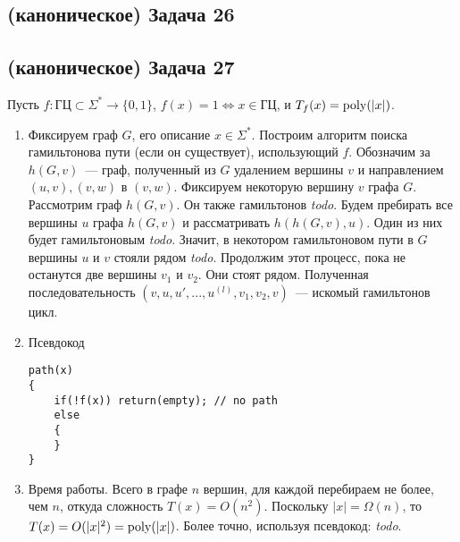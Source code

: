 \documentclass[a4paper]{article}
\def\poly{{\rm{poly}}}
\def\GC{{\mbox{ГЦ}}}
\newcommand{\todo}{{\em todo}}
\begin{document}
\subsection*{(каноническое) Задача 26}
\subsection*{(каноническое) Задача 27}
Пусть $f\colon \GC\subset\Sigma^*\to\{0,1\}$, $f(x)=1\Leftrightarrow x\in\GC$, и $T_f(x)=\poly(|x|)$.
\begin{enumerate}
\item Фиксируем граф $G$, его описание $x\in\Sigma^*$. Построим алгоритм поиска гамильтонова пути (если он существует), использующий $f$. Обозначим за $h(G, v)$~--- граф, полученный из $G$ удалением вершины $v$ и направлением $(u,v), (v, w)$ в $(v, w)$. Фиксируем некоторую вершину $v$ графа $G$. Рассмотрим граф $h(G,v)$. Он также гамильтонов \todo. Будем пребирать все вершины $u$ графа $h(G,v)$ и рассматривать $h(h(G,v),u)$. Один из них будет гамильтоновым \todo. Значит, в некотором гамильтоновом пути в $G$ вершины $u$ и $v$ стояли рядом \todo. Продолжим этот процесс, пока не останутся две вершины $v_1$ и $v_2$. Они стоят рядом. Полученная последовательность $(v,u,u',...,u^{(l)},v_1,v_2,v)$~--- искомый гамильтонов цикл.
\item Псевдокод
\begin{lstlisting}
path(x)
{
    if(!f(x)) return(empty); // no path
    else
    {
    }
}
\end{lstlisting}
\item Время работы. Всего в графе $n$ вершин, для каждой перебираем не более, чем $n$, откуда сложность $T(x)=O(n^2)$. Поскольку $|x|=\Omega(n)$, то $T(x)=O(|x|^2)=\poly(|x|)$. Более точно, используя псевдокод: \todo.
\end{enumerate}
\end{document}
